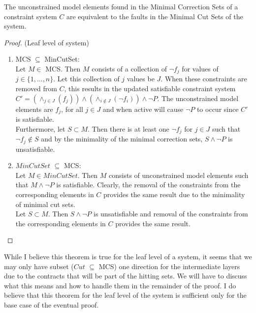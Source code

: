 \begin{theorem} The unconstrained model elements found in the Minimal Correction Sets of a constraint system $C$ are equivalent to the faults in the Minimal Cut Sets of the system.
\begin{proof} (Leaf level of system)
\begin{enumerate}[label=(\roman*)]

\item MCS $\subseteq$ MinCutSet: \\

Let $M \in $ MCS. Then $M$ consists of a collection of $\neg f_j$ for values of $j \in \{1,...,n\}$. Let this collection of $j$ values be $J$. When these constraints are removed from $C$, this results in the updated satisfiable constraint system $C' = (\wedge_{j \in J}(f_j)) \land (\wedge_{i \notin J}(\neg f_i)) \land \neg P$. The unconstrained model elements are $f_j$, for all $j \in J$ and when active will cause $\neg P$ to occur since $C'$ is satisfiable.\\

Furthermore, let $S \subset M$. Then there is at least one $\neg f_j$ for $j \in J$ such that $\neg f_j \notin S$ and by the minimality of the minimal correction sets, $S \land \neg P$ is unsatisfiable. \\

\item $MinCutSet $ $\subseteq$ MCS: \\

Let $M \in MinCutSet$. Then $M$ consists of unconstrained model elements such that $M \land \neg P$ is satisfiable. Clearly, the removal of the constraints from the corresponding elements in $C$ provides the same result due to the minimality of minimal cut sets. \\

Let $S \subset M$. Then $S \land \neg P$ is unsatisfiable and removal of the constraints from the corresponding elements in $C$ provides the same result. \\
\end{enumerate}
\end{proof}
\end{theorem}

While I believe this theorem is true for the leaf level of a system, it seems that we may only have subset ($Cut $ $\subseteq$ MCS) one direction for the intermediate layers due to the contracts that will be part of the hitting sets. We will have to discuss what this means and how to handle them in the remainder of the proof. I do believe that this theorem for the leaf level of the system is sufficient only for the base case of the eventual proof. 



\fi

































